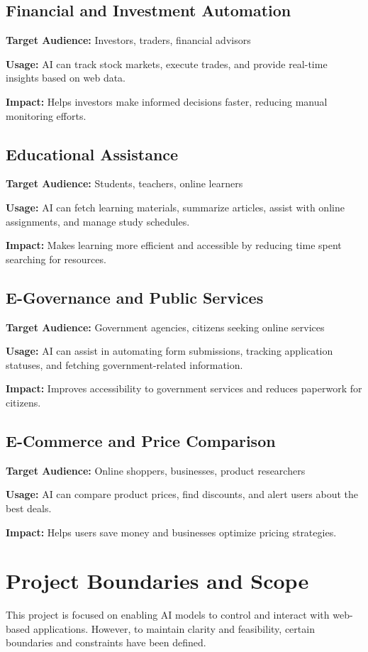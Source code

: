 \documentclass[conference]{IEEEtran}
\begin{document}
\subsection{Financial and Investment Automation}
\textbf{Target Audience:} Investors, traders, financial advisors

\textbf{Usage:} AI can track stock markets, execute trades, and provide real-time insights based on web data.

\textbf{Impact:} Helps investors make informed decisions faster, reducing manual monitoring efforts.

\subsection{Educational Assistance}
\textbf{Target Audience:} Students, teachers, online learners

\textbf{Usage:} AI can fetch learning materials, summarize articles, assist with online assignments, and manage study schedules.

\textbf{Impact:} Makes learning more efficient and accessible by reducing time spent searching for resources.

\subsection{E-Governance and Public Services}
\textbf{Target Audience:} Government agencies, citizens seeking online services

\textbf{Usage:} AI can assist in automating form submissions, tracking application statuses, and fetching government-related information.

\textbf{Impact:} Improves accessibility to government services and reduces paperwork for citizens.

\subsection{E-Commerce and Price Comparison}
\textbf{Target Audience:} Online shoppers, businesses, product researchers

\textbf{Usage:} AI can compare product prices, find discounts, and alert users about the best deals.

\textbf{Impact:} Helps users save money and businesses optimize pricing strategies.

\section{Project Boundaries and Scope}
This project is focused on enabling AI models to control and interact with web-based applications. However, to maintain clarity and feasibility, certain boundaries and constraints have been defined.
\end{document}
